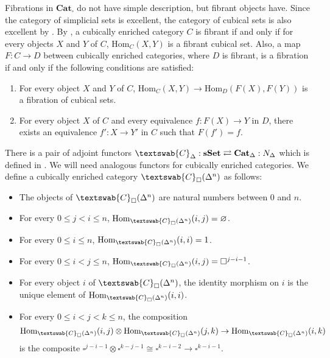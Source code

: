 \documentclass[reqno]{amsart}
\theoremstyle{definition}
\theoremstyle{remark}
\newcommand{\cat}[1]{\mathbf{#1}}
\newcommand{\Cat}{\cat{Cat}}
\newcommand{\sSet}{\cat{sSet}}
\newcommand{\Hom}{\mathrm{Hom}}
\numberwithin{figure}{section}
\begin{document}
\begin{rem}
Fibrations in $\Cat_\square$ do not have simple description, but fibrant objects have.
Since the category of simplicial sets is excellent, the category of cubical sets is also excellent by \cite[Remark~A.3.2.21]{lurie-topos}.
By \cite[Theorem~A.3.2.24]{lurie-topos}, a cubically enriched category $C$ is fibrant
if and only if for every objects $X$ and $Y$ of $C$, $\Hom_C(X,Y)$ is a fibrant cubical set.
Also, a map $F : C \to D$ between cubically enriched categories, where $D$ is fibrant, is a fibration if and only if the following conditions are satisfied:
\begin{enumerate}
\item For every object $X$ and $Y$ of $C$, $\Hom_C(X,Y) \to \Hom_D(F(X),F(Y))$ is a fibration of cubical sets.
\item For every object $X$ of $C$ and every equivalence $f : F(X) \to Y$ in $D$, there exists an equivalence $f' : X \to Y'$ in $C$ such that $F(f') = f$.
\end{enumerate}
\end{rem}

There is a pair of adjoint functors $\textswab{C}_\Delta : \sSet \rightleftarrows \Cat_\Delta : N_\Delta$ which is defined in \cite[Section~1.1.5]{lurie-topos}.
We will need analogous functors for cubically enriched categories.
We define a cubically enriched category $\textswab{C}_\square(\Delta^n)$ as follows:
\begin{itemize}
\item The objects of $\textswab{C}_\square(\Delta^n)$ are natural numbers between $0$ and $n$.
\item For every $0 \leq j < i \leq n$, $\Hom_{\textswab{C}_\square(\Delta^n)}(i,j) = \varnothing$.
\item For every $0 \leq i \leq n$, $\Hom_{\textswab{C}_\square(\Delta^n)}(i,i) = 1$.
\item For every $0 \leq i < j \leq n$, $\Hom_{\textswab{C}_\square(\Delta^n)}(i,j) = \square^{j-i-1}$.
\item For every object $i$ of $\textswab{C}_\square(\Delta^n)$, the identity morphism on $i$ is the unique element of $\Hom_{\textswab{C}_\square(\Delta^n)}(i,i)$.
\item For every $0 \leq i < j < k \leq n$, the composition
\[ \Hom_{\textswab{C}_\square(\Delta^n)}(i,j) \otimes \Hom_{\textswab{C}_\square(\Delta^n)}(j,k) \to \Hom_{\textswab{C}_\square(\Delta^n)}(i,k) \]
is the composite $\square^{j-i-1} \otimes \square^{k-j-1} \cong \square^{k-i-2} \to \square^{k-i-1}$.
\end{itemize}



\end{document}
